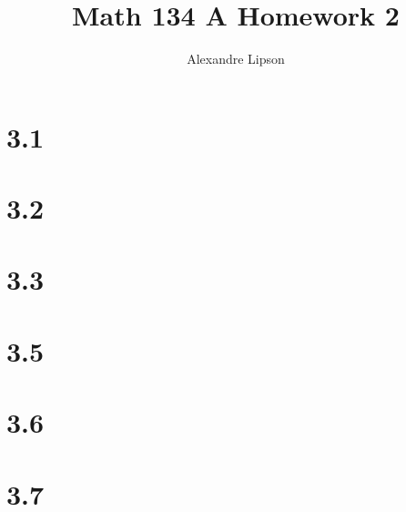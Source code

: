 \documentclass{article}
\title{Math 134 A Homework 2}
\author{Alexandre Lipson}
\begin{document}
\maketitle

\section*{3.1}


\section*{3.2}


\section*{3.3}


\section*{3.5}


\section*{3.6}


\section*{3.7}

\end{document}
